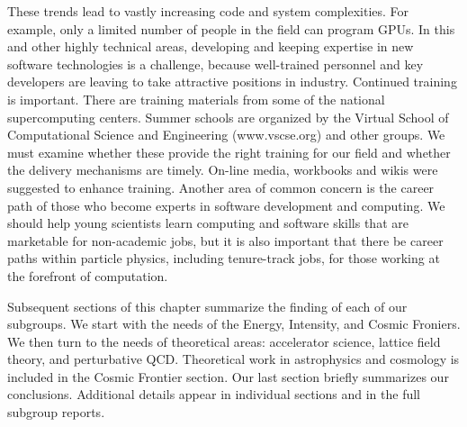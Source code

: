 These trends lead to vastly increasing code and system complexities. For
example, only a limited number of people in the field can program GPUs. In
this and other highly technical areas, developing and keeping expertise in
new software technologies is a challenge, because well-trained personnel and
key developers are leaving to take attractive positions in industry.
Continued training is important.  There are training materials
from some of the national supercomputing centers.  Summer schools are
organized by the Virtual School of Computational Science and
Engineering (www.vscse.org) and other groups. 
We must examine whether these provide the
right training for our field and whether the delivery mechanisms are
timely.  On-line media, workbooks and wikis were suggested to enhance
training. Another area of common concern is the career path of those who
become experts in software development and computing. We should help
young scientists learn computing and software skills that are marketable
for non-academic jobs, but it is also important that there be career paths
within particle physics, including tenure-track jobs, for those working at
the forefront of computation.

Subsequent sections of this chapter summarize the finding of each of our subgroups.
We start with the needs of the Energy, Intensity, and Cosmic Froniers.  We then
turn to the needs of theoretical areas: accelerator science, lattice field theory,
and perturbative QCD.  Theoretical work in astrophysics and cosmology is included
in the Cosmic Frontier section.  
Our last section briefly summarizes our conclusions.
Additional details appear in individual sections and in the full subgroup
reports.
